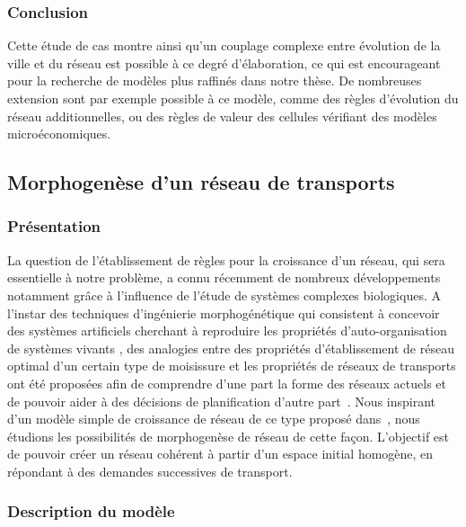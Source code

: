 \documentclass[french,12pt]{article}
\begin{document}
\subsubsection{Conclusion}

Cette étude de cas montre ainsi qu’un couplage complexe entre évolution de la ville et du réseau est possible à ce degré d’élaboration, ce qui est encourageant pour la recherche de modèles plus raffinés dans notre thèse. De nombreuses extension sont par exemple possible à ce modèle, comme des règles d’évolution du réseau additionnelles, ou des règles de valeur des cellules vérifiant des modèles microéconomiques.









\subsection{Morphogenèse d'un réseau de transports}


\subsubsection{Présentation}

La question de l’établissement de règles pour la croissance d’un réseau, qui sera essentielle à notre problème, a connu récemment de nombreux développements notamment grâce à l’influence de l’étude de systèmes complexes biologiques. A l’instar des techniques d’ingénierie morphogénétique qui consistent à concevoir des systèmes artificiels cherchant à reproduire les propriétés d’auto-organisation de systèmes vivants \cite{doursat2012morphogenetic}, des analogies entre des propriétés d’établissement de réseau optimal d’un certain type de moisissure et les propriétés de réseaux de transports ont été proposées afin de comprendre d’une part la forme des réseaux actuels et de pouvoir aider à des décisions de planification d’autre part~\cite{adamatzky2010road,Bebber22092007}. Nous inspirant d’un modèle simple de croissance de réseau de ce type proposé dans~\cite{TeroAl10}, nous étudions les possibilités de morphogenèse de réseau de cette façon. L’objectif est de pouvoir créer un réseau cohérent à partir d’un espace initial homogène, en répondant à des demandes successives de transport.


\subsubsection{Description du modèle}
\end{document}
